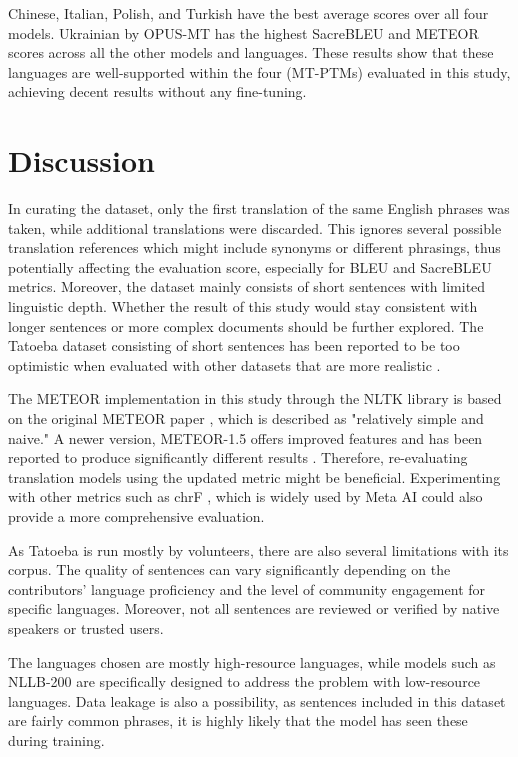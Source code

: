 \documentclass[a4paper, 11pt]{article}
\begin{document}
Chinese, Italian, Polish, and Turkish have the best average scores over all four models. Ukrainian by OPUS-MT has the highest SacreBLEU and METEOR scores across all the other models and languages. These results show that these languages are well-supported within the four (MT-PTMs) evaluated in this study, achieving decent results without any fine-tuning.

\section{Discussion}

In curating the dataset, only the first translation of the same English phrases was taken, while additional translations were discarded. This ignores several possible translation references which might include synonyms or different phrasings, thus potentially affecting the evaluation score, especially for BLEU and SacreBLEU metrics. Moreover, the dataset mainly consists of short sentences with limited linguistic depth. Whether the result of this study would stay consistent with longer sentences or more complex documents should be further explored. The Tatoeba dataset \cite{tiedemann-2020-tatoeba-challenge} consisting of short sentences has been reported to be too optimistic when evaluated with other datasets that are more realistic \cite{tiedemann-2020-opus-mt}.

The METEOR implementation in this study through the NLTK library is based on the original METEOR paper \cite{lavie-2007-meteor}, which is described as "relatively simple and naive." A newer version, METEOR-1.5 \cite{denkowski-lavie-2014-meteor-universal} offers improved features and has been reported to produce significantly different results \cite{tuetschek-2021-meteor-issue-nltk}. Therefore, re-evaluating translation models using the updated metric might be beneficial. Experimenting with other metrics such as chrF \cite{popovic-2015-chrf}, which is widely used by Meta AI \cite{nllb200-2020} could also provide a more comprehensive evaluation.

As Tatoeba \cite{tatoeba} is run mostly by volunteers, there are also several limitations with its corpus. The quality of sentences can vary significantly depending on the contributors' language proficiency and the level of community engagement for specific languages. Moreover, not all sentences are reviewed or verified by native speakers or trusted users.

The languages chosen are mostly high-resource languages, while models such as NLLB-200 \cite{nllb200-2020} are specifically designed to address the problem with low-resource languages. Data leakage is also a possibility, as sentences included in this dataset are fairly common phrases, it is highly likely that the model has seen these during training.
\end{document}
